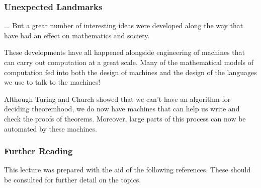 \documentclass{beamer}
\theoremstyle{indentDefn} \newtheorem{defn}[]{Definition}
\begin{document}
\begin{frame}
  \frametitle{Unexpected Landmarks}

  ... But a great number of interesting ideas were developed along the way that have had an effect on mathematics and society. 

  These developments have all happened alongside engineering of machines that can carry out computation at a great scale. Many of the mathematical models of computation fed into both the design of machines and the design of the languages we use to talk to the machines!

  Although Turing and Church showed that we can't have an algorithm for deciding theoremhood, we do now have machines that can help us write and check the proofs of theorems. Moreover, large parts of this process can now be automated by these machines. 
\end{frame}


\begin{frame}
	\frametitle{Further Reading}
	
    This lecture was prepared with the aid of the following references. 
    These should be consulted for further detail on the topics. 

    \printbibliography
	
\end{frame}
\end{document}

